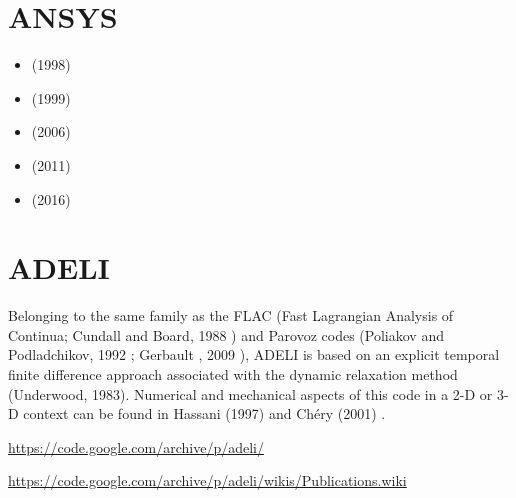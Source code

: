 \section{ANSYS} 

\begin{small}
\begin{itemize}
\item \textcite{mafs98} (1998)
\item \textcite{mafs99} (1999)
\item \textcite{nehe06} (2006)
\item \textcite{jabm11} (2011)
\item \textcite{guyr16} (2016)
\end{itemize}
\end{small}

\section{ADELI} 

Belonging to the same family as the FLAC 
(Fast Lagrangian Analysis of Continua; Cundall and Board, 1988 \cite{cubo88}) 
and Parovoz codes 
(Poliakov and Podladchikov, 1992 \cite{popo92}; Gerbault \etal, 2009 \cite{gecm09}), 
ADELI is based on an explicit temporal
finite difference approach associated with the dynamic relaxation method (Underwood, 1983). 
Numerical and mechanical aspects of this code in a 2-D or 3-D context can be 
found in Hassani \etal (1997) \cite{hajc97} and Ch\'ery \etal (2001) \cite{chzh01}.

\url{https://code.google.com/archive/p/adeli/}

\url{https://code.google.com/archive/p/adeli/wikis/Publications.wiki}

